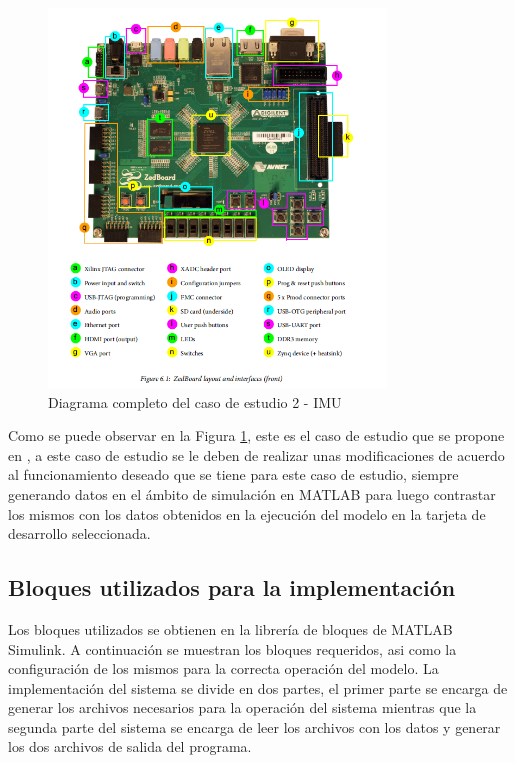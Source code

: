 \begin{figure}[h!]
    \centering
    \includegraphics[width=0.8\textwidth]{fig/especifico_2/154140ZedBoard.png}
    \caption{Diagrama completo del caso de estudio 2 - IMU \cite{mathworks2024imu}}
    \label{fig:caso_de_estudio_2_IMU}
\end{figure}


Como se puede observar en la Figura \ref{fig:caso_de_estudio_2_IMU}, este es el caso de estudio que se propone en \cite{mathworks2024imu}, a este caso de estudio se le deben de realizar unas modificaciones de acuerdo al funcionamiento deseado que se tiene para este caso de estudio, siempre generando datos en el ámbito de simulación en MATLAB para luego contrastar los mismos con los datos obtenidos en la ejecución del modelo en la tarjeta de desarrollo seleccionada.

\subsection{Bloques utilizados para la implementación}

Los bloques utilizados se obtienen en la librería de bloques de MATLAB Simulink. A continuación se muestran los bloques requeridos, asi como la configuración de los mismos para la correcta operación del modelo. La implementación del sistema se divide en dos partes, el primer parte se encarga de generar los archivos necesarios para la operación del sistema mientras que la segunda parte del sistema se encarga de leer los archivos con los datos y generar los dos archivos de salida del programa.

